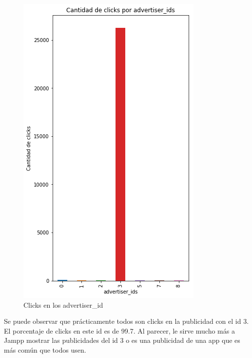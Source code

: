 \documentclass[a4paper, 12pt]{article}
\newcommand\tab[1][1cm]{\hspace*{#1}}
\begin{document}
		\FloatBarrier
		\begin{figure}[h]
			\centering
			\includegraphics[width=\textwidth]{images/clicks/clicks_advertiser_id.png}
			\caption{Clicks en los advertiser\_id}
		\end{figure}
		\FloatBarrier

		\tab Se puede observar que prácticamente todos son clicks en la publicidad con el id 3. El porcentaje de clicks en este id es de 99.7. Al parecer, le sirve mucho más a Jampp mostrar las publicidades del id 3 o es una publicidad de una app que es más común que todos usen.
\end{document}
